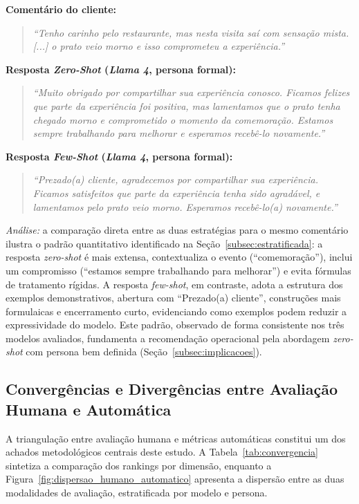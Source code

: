 \documentclass[12pt, a4paper]{article}
\numberwithin{equation}{section}
\begin{document}
 \noindent\textbf{Comentário do cliente:}
 \begin{quote}
 \textit{``Tenho carinho pelo restaurante, mas nesta visita saí com sensação mista. [...] o prato 
veio morno e isso comprometeu a experiência.''}
 \end{quote}
 
 \noindent\textbf{Resposta \textit{Zero-Shot} (\textit{Llama 4}, persona formal):}
 \begin{quote}
 \textit{``Muito obrigado por compartilhar sua experiência conosco. Ficamos felizes que parte da 
experiência foi positiva, mas lamentamos que o prato tenha chegado morno e comprometido o momento 
da comemoração. Estamos sempre trabalhando para melhorar e esperamos recebê-lo novamente.''}
 \end{quote}
 
 \noindent\textbf{Resposta \textit{Few-Shot} (\textit{Llama 4}, persona formal):}
 \begin{quote}
 \textit{``Prezado(a) cliente, agradecemos por compartilhar sua experiência. Ficamos satisfeitos 
que parte da experiência tenha sido agradável, e lamentamos pelo prato veio morno. Esperamos 
recebê-lo(a) novamente.''}
 \end{quote}
 
 \noindent\textit{Análise:} a comparação direta entre as duas estratégias para o mesmo comentário 
ilustra o padrão quantitativo identificado na Seção~\ref{subsec:estratificada}: a resposta 
\textit{zero-shot} é mais extensa, contextualiza o evento (``comemoração''), inclui um compromisso
 (``estamos sempre trabalhando para melhorar'') e evita fórmulas de tratamento rígidas. A resposta
 \textit{few-shot}, em contraste, adota a estrutura dos exemplos demonstrativos, abertura com ``Prezado(a) cliente'', construções mais formulaicas e encerramento curto, evidenciando como exemplos podem reduzir a expressividade do modelo. Este padrão, observado de forma consistente nos três modelos avaliados, fundamenta a recomendação operacional pela abordagem \textit{zero-shot} com persona bem definida (Seção~\ref{subsec:implicacoes}).

\subsection{Convergências e Divergências entre Avaliação Humana e Automática}

A triangulação entre avaliação humana e métricas automáticas constitui um dos achados metodológicos centrais deste estudo. A Tabela~\ref{tab:convergencia} sintetiza a comparação dos rankings por dimensão, enquanto a Figura~\ref{fig:dispersao_humano_automatico} apresenta a dispersão entre as duas modalidades de avaliação, estratificada por modelo e persona.
\end{document}
